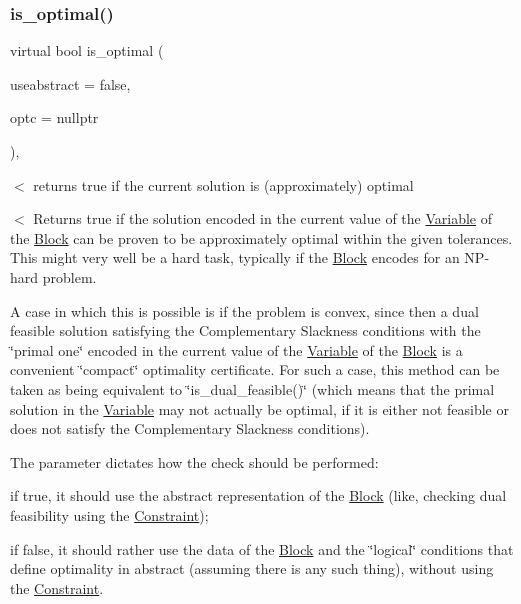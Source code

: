\subsubsection{\texorpdfstring{is\+\_\+optimal()}{is\_optimal()}}
{\footnotesize\ttfamily virtual bool is\+\_\+optimal (\begin{DoxyParamCaption}\item[{bool}]{useabstract = {\ttfamily false},  }\item[{\mbox{\hyperlink{class_s_m_spp__di__unipi__it_1_1_configuration}{Configuration}} $\ast$}]{optc = {\ttfamily nullptr} }\end{DoxyParamCaption})\hspace{0.3cm}{\ttfamily [inline]}, {\ttfamily [virtual]}}



$<$ returns true if the current solution is (approximately) optimal 

$<$ Returns true if the solution encoded in the current value of the \mbox{\hyperlink{class_s_m_spp__di__unipi__it_1_1_variable}{Variable}} of the \mbox{\hyperlink{class_s_m_spp__di__unipi__it_1_1_block}{Block}} can be proven to be approximately optimal within the given tolerances. This might very well be a hard task, typically if the \mbox{\hyperlink{class_s_m_spp__di__unipi__it_1_1_block}{Block}} encodes for an N\+P-\/hard problem.

A case in which this is possible is if the problem is convex, since then a dual feasible solution satisfying the Complementary Slackness conditions with the \char`\"{}primal one\char`\"{} encoded in the current value of the \mbox{\hyperlink{class_s_m_spp__di__unipi__it_1_1_variable}{Variable}} of the \mbox{\hyperlink{class_s_m_spp__di__unipi__it_1_1_block}{Block}} is a convenient \char`\"{}compact\char`\"{} optimality certificate. For such a case, this method can be taken as being equivalent to \char`\"{}is\+\_\+dual\+\_\+feasible()\char`\"{} (which means that the primal solution in the \mbox{\hyperlink{class_s_m_spp__di__unipi__it_1_1_variable}{Variable}} may not actually be optimal, if it is either not feasible or does not satisfy the Complementary Slackness conditions).

The parameter dictates how the check should be performed\+:


\begin{DoxyItemize}
\item if true, it should use the abstract representation of the \mbox{\hyperlink{class_s_m_spp__di__unipi__it_1_1_block}{Block}} (like, checking dual feasibility using the \mbox{\hyperlink{class_s_m_spp__di__unipi__it_1_1_constraint}{Constraint}});
\item if false, it should rather use the data of the \mbox{\hyperlink{class_s_m_spp__di__unipi__it_1_1_block}{Block}} and the \char`\"{}logical\char`\"{} conditions that define optimality in abstract (assuming there is any such thing), without using the \mbox{\hyperlink{class_s_m_spp__di__unipi__it_1_1_constraint}{Constraint}}.
\end{DoxyItemize}

